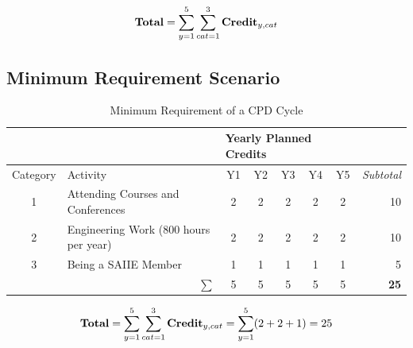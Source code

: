 \documentclass[11pt,a4paper]{article}
\begin{document}
	\begin{equation}\label{eq:1}
		\begin{array}{c}
			\text{\textbf{Total}} = \displaystyle\sum\limits_{y=1}^{5} \displaystyle\sum\limits_{cat=1}^{3} \textbf{Credit}_{y, cat}
		\end{array}
	\end{equation}
	
	\subsection{Minimum Requirement Scenario}
	
	\begin{table}[H]
\centering
\caption{Minimum Requirement of a CPD Cycle}
\label{tab: Minimum}
\begin{tabular}{cl|c|c|c|c|c|r}
\cline{3-7}
\multicolumn{1}{l}{}           &                                       & \multicolumn{5}{l|}{Yearly Planned Credits} & \multicolumn{1}{l}{}                   \\ \hline
\multicolumn{1}{|l|}{Category} & Activity                              & Y1      & Y2     & Y3     & Y4     & Y5     & \multicolumn{1}{r|}{\textit{Subtotal}} \\ \hline
\multicolumn{1}{|c|}{1}        & Attending Courses and Conferences     & 2       & 2      & 2      & 2      & 2      & \multicolumn{1}{r|}{10}                \\ \hline
\multicolumn{1}{|c|}{2}        & Engineering Work (800 hours per year) & 2       & 2      & 2      & 2      & 2      & \multicolumn{1}{r|}{10}                \\ \hline
\multicolumn{1}{|c|}{3}        & Being a SAIIE Member                  & 1       & 1      & 1      & 1      & 1      & \multicolumn{1}{r|}{5}                 \\ \hline
\multicolumn{2}{|r|}{$\sum$}                                              & 5       & 5      & 5      & 5      & 5      & \multicolumn{1}{r|}{\textbf{25}}       \\ \hline
\end{tabular}
\end{table}


	\begin{equation}\label{eq:2}
		\begin{array}{c}
			\text{\textbf{Total}} = \displaystyle\sum\limits_{y=1}^{5} \displaystyle\sum\limits_{cat=1}^{3} \textbf{Credit}_{y, cat} = \displaystyle\sum\limits_{y=1}^{5} (2 + 2 + 1) = 25
		\end{array}
	\end{equation}
\end{document}
